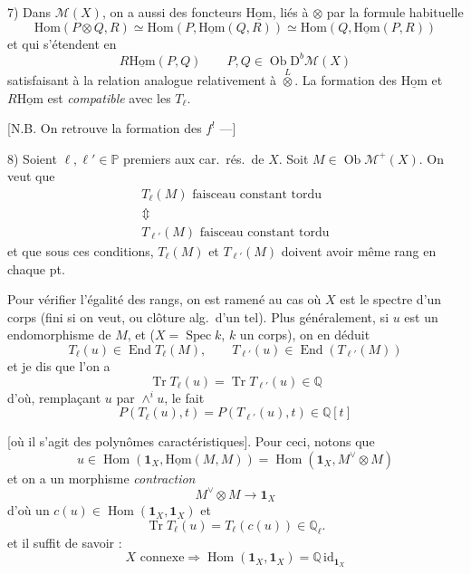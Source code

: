 \documentclass[11pt,a4paper]{article}
\begin{document}
7) Dans $\mathcal{M}(X)$, on a aussi des foncteurs
$\underline{\mathrm{Hom}}$, liés à $\otimes$ par la formule habituelle
\[
  \mathrm{Hom}(P \otimes Q, R) \simeq \mathrm{Hom}(P, \underline{\mathrm{Hom}}(Q, R))
  \simeq \mathrm{Hom}(Q, \underline{\mathrm{Hom}}(P, R))
\]
et  qui s'étendent en
\[
  R\underline{\mathrm{Hom}}(P, Q) \qquad P, Q \in \operatorname{Ob} \mathrm{D}^{b}\mathcal{M}(X)
\]
satisfaisant à la relation analogue relativement à $\overset{L}{\otimes}$.
La formation des $\underline{\mathrm{Hom}}$ et $R\underline{\mathrm{Hom}}$ est
\emph{compatible} avec les $T_{\ell}$.

 [N.B. On retrouve la formation des $f^{!}$ —]

8) Soient $\ell, \ell' \in \mathbb{P}$ premiers aux car.\ rés.\ de $X$. Soit
$M \in \operatorname{Ob} \mathcal{M}^{+}(X)$. On veut que
\[
  \begin{array}{c}
    T_{\ell}(M) \text{ faisceau constant tordu} \\
    \Updownarrow \\
    T_{\ell'}(M) \text{ faisceau constant tordu}
  \end{array}
\]
et que sous ces conditions, $T_{\ell}(M)$ et $T_{\ell'}(M)$ doivent avoir
même rang en chaque pt.

Pour vérifier l'égalité des rangs, on est ramené au cas où $X$ est le spectre
d'un corps (fini si on veut, ou clôture alg.\ d'un tel). Plus généralement,
si $u$ est un endomorphisme de $M$, et ($X = \operatorname{Spec} k$, $k$ un
corps), on en déduit
\[
  T_{\ell}(u) \in \operatorname{End} T_{\ell}(M), \qquad
  T_{\ell'}(u) \in \operatorname{End}(T_{\ell'}(M))
\]
et je dis que l'on a
\[
  \boxed{\operatorname{Tr} T_{\ell}(u) = \operatorname{Tr} T_{\ell'}(u) \in \mathbb{Q}}
\]
d'où, remplaçant $u$ par $\wedge^{i} u$, le fait
\[
  \boxed{P(T_{\ell}(u), t) = P(T_{\ell'}(u), t) \in \mathbb{Q}[t]}
\]

[où il s'agit des polynômes caractéristiques]. Pour ceci, notons que
\[
  u \in \operatorname{Hom}(\mathbf{1}_{X}, \underline{\mathrm{Hom}}(M, M))
  = \operatorname{Hom}(\mathbf{1}_{X}, M^{\vee} \otimes M)
\]
et on a un morphisme \emph{contraction}
\[
  M^{\vee} \otimes M \to \mathbf{1}_{X}
\]
d'où un $c(u) \in \operatorname{Hom}(\mathbf{1}_{X}, \mathbf{1}_{X})$ et
\struck{\ill{}}
\[
  \operatorname{Tr} T_{\ell}(u) = T_{\ell}(c(u)) \in \mathbb{Q}_{\ell} .
\]
et il suffit de savoir :
\[
  \boxed{X \text{ connexe} \Longrightarrow \operatorname{Hom}(\mathbf{1}_{X}, \mathbf{1}_{X}) = \mathbb{Q}\, \mathrm{id}_{\mathbf{1}_{X}}}
\]
\end{document}
